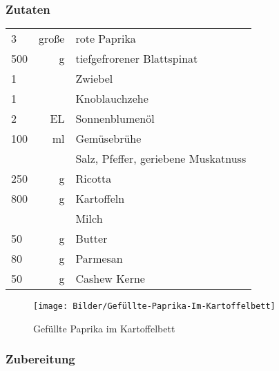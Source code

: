\subsubsection*{Zutaten}
\begin{tabular}{lrl}
    3   & große & rote Paprika                        \\
    500 &     g & tiefgefrorener Blattspinat          \\
    1   &       & Zwiebel                             \\
    1   &       & Knoblauchzehe                       \\
    2   &    EL & Sonnenblumenöl                      \\
    100 &    ml & Gemüsebrühe                         \\
    &       & Salz, Pfeffer, geriebene Muskatnuss \\
    250 &     g & Ricotta                             \\
    800 &     g & Kartoffeln                          \\
    &       & Milch                               \\
    50  &     g & Butter                              \\
    80  &     g & Parmesan                            \\
    50  &     g & Cashew Kerne
\end{tabular} 


\begin{figure}
    \centering
    \texttt{[image: Bilder/Gefüllte-Paprika-Im-Kartoffelbett]}
    \caption{Gefüllte Paprika im Kartoffelbett}
    \label{fig:gefullte-paprika-im-kartoffelbett}
\end{figure}

\subsubsection*{Zubereitung}

